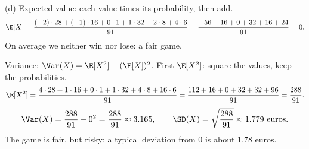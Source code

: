 \begin{slides}
	\small
	(d) Expected value: each value times its probability, then add.
	\[ \E[X]=\frac{(-2)\cdot28+(-1)\cdot16+0\cdot1+1\cdot32+2\cdot8+4\cdot6}{91}
		=\frac{-56-16+0+32+16+24}{91}=0. \]
	On average we neither win nor lose: a \alert{fair game}.
	\pause
	\medskip

	Variance: $\Var(X)=\E[X^2]-(\E[X])^2$. First $\E[X^2]$: square the values,
	keep the probabilities.
	\[ \E[X^2]=\frac{4\cdot28+1\cdot16+0\cdot1+1\cdot32+4\cdot8+16\cdot6}{91}
		=\frac{112+16+0+32+32+96}{91}=\frac{288}{91}. \]
	\pause
	\[ \Var(X)=\frac{288}{91}-0^2=\frac{288}{91}\approx3.165, \qquad
		\SD(X)=\sqrt{\frac{288}{91}}\approx1.779 \text{ euros}. \]
	\pause
	The game is fair, but risky: a typical deviation from 0 is about
	1.78 euros.
\end{slides}

